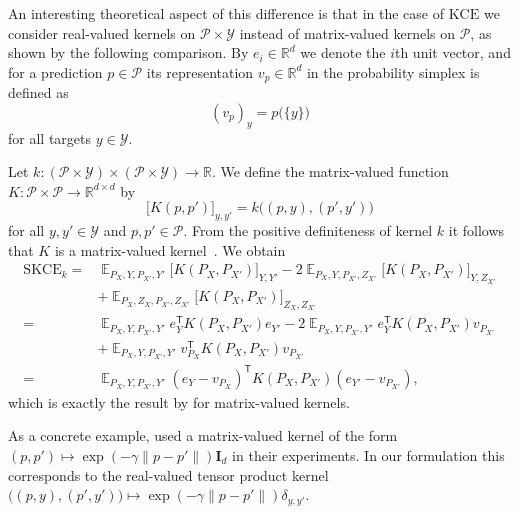 \documentclass{article}
\DeclareMathOperator{\Exp}{\mathbb{E}}
\begin{document}
An interesting theoretical aspect of this difference is that
in the case of $\mathrm{KCE}$ we consider real-valued kernels on
$\mathcal{P} \times \mathcal{Y}$ instead of
matrix-valued kernels on $\mathcal{P}$, as shown by the following
comparison. By $e_i \in \mathbb{R}^d$ we denote the $i$th unit vector,
and for a prediction $p \in \mathcal{P}$ its representation
$v_p \in \mathbb{R}^d$ in the probability simplex is defined as
\begin{equation*}
    {(v_p)}_y = p\big(\{y\}\big)
\end{equation*}
for all targets $y \in \mathcal{Y}$.

Let $k \colon (\mathcal{P} \times \mathcal{Y}) \times (\mathcal{P} \times \mathcal{Y}) \to \mathbb{R}$.
We define the matrix-valued function
$K \colon \mathcal{P} \times \mathcal{P} \to \mathbb{R}^{d \times d}$
by
\begin{equation*}
    \big[K(p, p')\big]_{y,y'} = k\big((p, y), (p', y')\big)
\end{equation*}
for all $y,y' \in \mathcal{Y}$ and $p, p' \in \mathcal{P}$.
From the positive definiteness of kernel $k$ it follows that
$K$ is a matrix-valued kernel~\citep[Definition~2]{Micchelli2005}.
We obtain
\begin{equation*}
    \begin{split}
        \mathrm{SKCE}_{k} ={}& \Exp_{P_X,Y,P_{X'},Y'} \big[K(P_X, P_{X'})\big]_{Y,Y'}
        - 2 \Exp_{P_X,Y,P_{X'},Z_{X'}} \big[K(P_X, P_{X'})\big]_{Y,Z_{X'}} \\
        &+ \Exp_{P_X,Z_X,P_{X'},Z_{X'}} \big[K(P_X, P_{X'})\big]_{Z_X,Z_{X'}} \\
        ={}& \Exp_{P_X,Y,P_{X'},Y'} e_Y^\mathsf{T} K(P_X, P_{X'}) e_{Y'}
        - 2 \Exp_{P_X,Y,P_{X'},Y'} e_Y^\mathsf{T} K(P_X, P_{X'}) v_{P_{X'}} \\
        & + \Exp_{P_X,Y,P_{X'},Y'} v_{P_X}^\mathsf{T} K(P_X, P_{X'}) v_{P_{X'}} \\
        ={}& \Exp_{P_X,Y,P_{X'},Y'}{(e_Y - v_{P_X})}^\mathsf{T} K(P_X, P_{X'}) (e_{Y'} - v_{P_{X'}}),
    \end{split}
\end{equation*}
which is exactly the result by \citet{Widmann2019}
for matrix-valued kernels.

As a concrete example, \citet{Widmann2019} used a
matrix-valued kernel of the form
$(p, p') \mapsto \exp{(- \gamma \|p - p'\|)} \mathbf{I}_d$
in their experiments. In our formulation this corresponds to the
real-valued tensor product kernel
$\big((p, y), (p', y')\big) \mapsto \exp{(- \gamma \|p - p'\|)} \delta_{y,y'}$.
\end{document}

